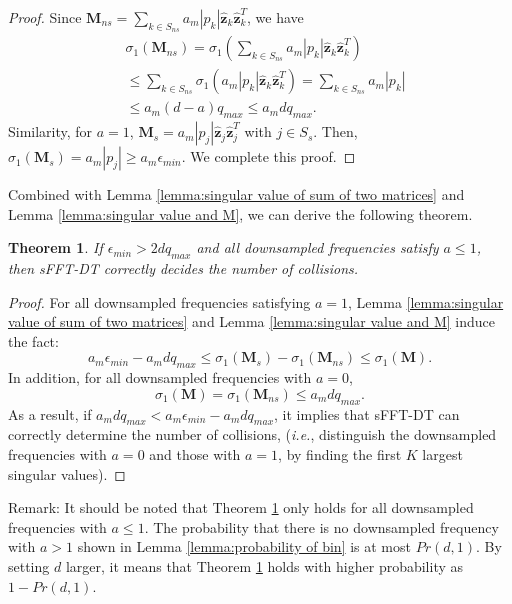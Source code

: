 \documentclass[journal,onecolumn,11pt]{IEEEtran}
\newtheorem{theorem}{Theorem}
\begin{document}
\begin{proof}
Since $\bm{M}_{ns}=\sum_{k \in S_{ns}  }  a_{m}|p_{k}|\hat{\bm{z}}_{k}\hat{\bm{z}}_{k}^{T}$, we have
\begin{equation}
\begin{aligned}
&\sigma_{1}(\bm{M}_{ns}) = \sigma_{1}( \sum_{k \in S_{ns}  }  a_{m}|p_{k}|\hat{\bm{z}}_{k}\hat{\bm{z}}_{k}^{T})\\
&\leq \sum_{k \in S_{ns}  } \sigma_{1}(  a_{m}|p_{k}|\hat{\bm{z}}_{k}\hat{\bm{z}}_{k}^{T}) = \sum_{k \in S_{ns}  } a_{m}|p_{k}| \\
&\leq a_{m}(d-a)q_{max} \leq a_{m}dq_{max}.
\label{eq:max singular value of insignificant term}
\end{aligned}
\end{equation}
Similarity, for $a=1$, $\bm{M}_{s}= a_{m}|p_{j}|\hat{\bm{z}}_{j}\hat{\bm{z}}_{j}^{T}$ with $j \in S_{s}$. Then, $\sigma_{1}(\bm{M}_{s})=a_{m}|p_{j}| \geq a_{m}\epsilon_{min}$. We complete this proof.
\end{proof}

Combined with Lemma \ref{lemma:singular value of sum of two matrices} and Lemma \ref{lemma:singular value and M}, we can derive the following theorem.
\begin{theorem}
\label{theorem:successfuly determine a}
If $ \epsilon_{min} > 2dq_{max}$ and all downsampled frequencies satisfy $a \leq 1$, then sFFT-DT correctly decides the number of collisions.
\end{theorem}
\begin{proof}
For all downsampled frequencies satisfying $a = 1$, Lemma \ref{lemma:singular value of sum of two matrices} and Lemma \ref{lemma:singular value and M} induce the fact:
$$a_{m}\epsilon_{min}- a_{m}dq_{max} \leq \sigma_{1}(\bm{M}_{s})-\sigma_{1}(\bm{M}_{ns}) \leq \sigma_{1}(\bm{M}).$$
In addition, for all downsampled frequencies with $a=0$,
$$ \sigma_{1}(\bm{M})= \sigma_{1}(\bm{M}_{ns}) \leq a_{m}dq_{max}.$$
As a result, if $a_{m}dq_{max} < a_{m}\epsilon_{min}- a_{m}dq_{max}$, it implies that sFFT-DT can correctly determine the number of collisions, ({\em i.e.}, distinguish the downsampled frequencies with $a=0$ and those with $a=1$, by finding the first $K$ largest singular values).
\end{proof}

Remark: It should be noted that Theorem \ref{theorem:successfuly determine a} only holds for all downsampled frequencies with $a \leq 1$. The probability that there is no downsampled frequency with $a > 1$ shown in Lemma \ref{lemma:probability of bin} is at most $Pr(d,1)$. By setting $d$ larger, it means that Theorem \ref{theorem:successfuly determine a} holds with higher probability as $1-Pr(d,1)$.
\end{document}
